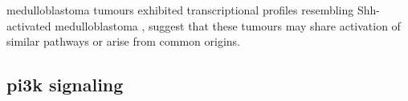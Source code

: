 medulloblastoma tumours exhibited transcriptional profiles resembling Shh-activated medulloblastoma , suggest that these tumours may share activation of similar pathways or arise from common origins.





\subsection{\gls{pi3k} signaling}

